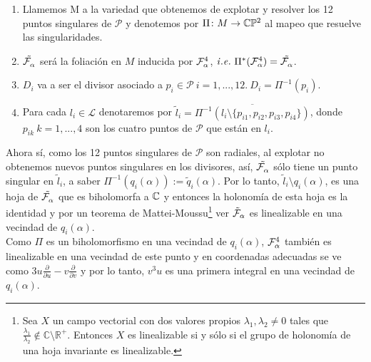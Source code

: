 \begin{Not}
\label{Notimp}
\begin{enumerate}

\*

\item Llamemos M a la variedad que obtenemos de explotar y resolver los 12 puntos singulares de $\mathcal{P}$ y denotemos por $\Pi\colon M \rightarrow \CP$ al mapeo que resuelve las singularidades.

\item $\tilde{\Fol{\alpha}}$ será la foliación en $M$ inducida por $\Fol[4]{\alpha}$,  $\mathit{i.e.} \ \Pi^{*}(\Fol[4]{\alpha}) = \tilde{\Fol{\alpha}}$.

\item $D_{i}$ va a ser el divisor asociado a $p_{i} \in \mathcal{P} \ i=1,...,12. \ D_{i} = \Pi^{-1}(p_{i})$.

\item Para cada $l_{i} \in \mathcal{L}$ denotaremos por $\tilde{l}_{i} = \overline{\Pi^{-1}(l_{i} \setminus \{p_{i1}, p_{i2}, p_{i3}, p_{i4} \})}$, donde $p_{ik} \ k=1,...,4$ son los cuatro puntos de $\mathcal{P}$ que están en $l_{i}$.

\end{enumerate}
\end{Not}
Ahora sí, como los 12 puntos singulares de $\mathcal{P}$ son radiales, al explotar no obtenemos nuevos puntos singulares en los divisores, así, $\tilde{\Fol{\alpha}}$ sólo tiene un punto singular en $\tilde{l}_{i}$, a saber $\Pi^{-1}(q_{i}(\alpha)) := \tilde{q}_{i}(\alpha)$. Por lo tanto, $\tilde{l}_{i}\setminus q_{i}(\alpha)$, es una hoja de $\tilde{\Fol{\alpha}}$ que es biholomorfa a $\C$ y entonces la holonomía de esta hoja es la identidad y por un teorema de Mattei-Moussu\footnote{Sea $X$ un campo vectorial con dos valores propios $\lambda_{1},\lambda_{2}\neq 0$ tales que $\tfrac{\lambda_{1}}{\lambda_{2}}\notin\mathbb{C}\setminus\mathbb{R}^{+}$. Entonces $X$ es linealizable si y sólo si el grupo de holonomía de una hoja invariante es linealizable.} ver \cite[teorema, 2 p.~482]{Mattei-Moussu} $\tilde{\Foli}_{\alpha}$ es linealizable en una vecindad de $q_{i}(\alpha)$.
\\

Como $\Pi$ es un biholomorfismo en una vecindad de $q_{i}(\alpha)$, $\Fol[4]{\alpha}$ también es linealizable en una vecindad de este punto y en coordenadas adecuadas se ve como $3u\frac{\partial}{\partial u} - v\frac{\partial}{\partial v}$ y por lo tanto, $v^{3}u$ es una primera integral en una vecindad de $q_{i}(\alpha)$.
\\

